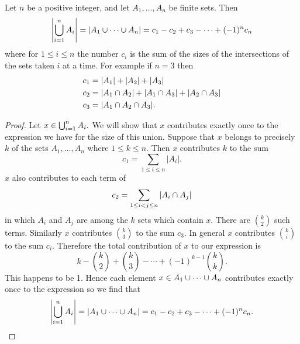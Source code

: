         \begin{theorem}
            Let \(n\) be a positive integer, and  let \(A_1, \dotsc, A_n\) be finite sets.
            Then
            \[\abs{\bigcup_{i = 1}^n A_i} = |A_1 \cup \dotsb \cup A_n| = c_1 - c_2 + c_3 - \dotsb + (-1)^nc_n\]
            where for \(1 \le i \le n\) the number \(c_i\) is the sum of the sizes of the intersections of the sets taken \(i\) at a time.
            For example if \(n = 3\) then
            \begin{align*}
                c_1 &= |A_1| + |A_2| + |A_3|\\
                c_2 &= |A_1 \cap A_2| + |A_1 \cap A_3| + |A_2 \cap A_3|\\
                c_3 &= |A_1 \cap A_2 \cap A_3|.
            \end{align*}
        \end{theorem}
        \begin{proof}
            Let \(x \in \bigcup_{i = 1}^n A_i.\)
            We will show that \(x\) contributes exactly once to the expression we have for the size of this union.
            Suppose that \(x\) belongs to precisely \(k\) of the sets \(A_1, \dotsc, A_n\) where \(1 \le k \le n\).
            Then \(x\) contributes \(k\) to the sum 
            \[c_1 = \sum_{1\le i\le n}|A_i|.\]
            \(x\) also contributes to each term of
            \[c_2 = \sum_{1\le i<j \le n}|A_i\cap A_j|\]
            in which \(A_i\) and \(A_j\) are among the \(k\) sets which contain \(x\).
            There are \({k\choose 2}\) such terms.
            Similarly \(x\) contributes \({k\choose 3}\) to the sum \(c_3\).
            In general \(x\) contributes \({k\choose i}\) to the sum \(c_i\).
            Therefore the total contribution of \(x\) to our expression is
            \[k - {k\choose 2} + {k\choose 3} - \dotsb + (-1)^{k-1}{k\choose k}.\]
            This happens to be 1.
            Hence each element \(x \in A_1\cup\dotsb\cup A_n\) contributes exactly once to the expression so we find that
            \[\abs{\bigcup_{i = 1}^n A_i} = |A_1 \cup \dotsb \cup A_n| = c_1 - c_2 + c_3 - \dotsb + (-1)^nc_n.\]
        \end{proof}